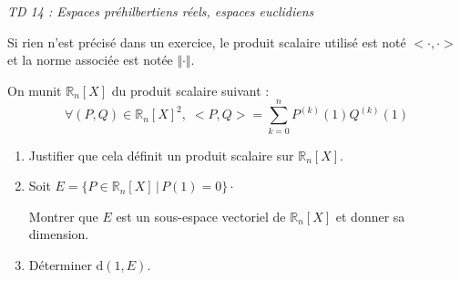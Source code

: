 \documentclass[a4paper,10pt]{report}
\begin{document}
\everymath{\displaystyle}


\begin{center}
\textit{{ {\huge TD 14 : Espaces préhilbertiens réels, espaces euclidiens}}}
\end{center}

\bigskip

\noindent Si rien n'est précisé dans un exercice, le produit scalaire utilisé est noté $< \cdot , \cdot >$ et la norme associée est notée $\Vert \cdot \Vert$.

\medskip


\begin{Exa} 
On munit $\mathbb{R}_n[X]$ du produit scalaire suivant :
$$ \forall (P,Q) \in \mathbb{R}_n[X]^2, \; <P,Q> = \sum_{k=0}^{n} P^{(k)}(1)Q^{(k)}(1)$$
\begin{enumerate}
\item Justifier que cela définit un produit scalaire sur $\mathbb{R}_n[X]$.
\item Soit $E= \lbrace P \in \mathbb{R}_n[X] \, \vert \, P(1)=0 \rbrace \cdot$

\noindent Montrer que $E$ est un sous-espace vectoriel de $\mathbb{R}_n[X]$ et donner sa dimension.
\item Déterminer $\textrm{d}(1,E)$.
\end{enumerate}
\end{Exa}
\end{document}
